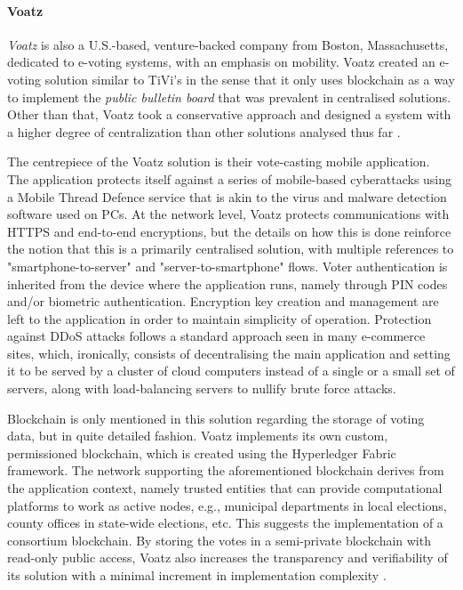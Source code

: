 \documentclass[../access.tex]{subfiles}
\begin{document}
\paragraph{Voatz \cite{Voatz2021}}
\textit{Voatz} is also a U.S.-based, venture-backed company from Boston, Massachusetts, dedicated to e-voting systems, with an emphasis on mobility. Voatz created an e-voting solution similar to TiVi's in the sense that it only uses blockchain as a way to implement the \textit{public bulletin board} that was prevalent in centralised solutions. Other than that, Voatz took a conservative approach and designed a system with a higher degree of centralization than other solutions analysed thus far \cite{Voatz2021}.
\par
The centrepiece of the Voatz solution is their vote-casting mobile application. The application protects itself against a series of mobile-based cyberattacks using a Mobile Thread Defence service that is akin to the virus and malware detection software used on PCs. At the network level, Voatz protects communications with HTTPS and end-to-end encryptions, but the details on how this is done reinforce the notion that this is a primarily centralised solution, with multiple references to "smartphone-to-server" and "server-to-smartphone" flows. Voter authentication is inherited from the device where the application runs, namely through PIN codes and/or biometric authentication. Encryption key creation and management are left to the application in order to maintain simplicity of operation. Protection against DDoS attacks follows a standard approach seen in many e-commerce sites, which, ironically, consists of decentralising the main application and setting it to be served by a cluster of cloud computers instead of a single or a small set of servers, along with load-balancing servers to nullify brute force attacks.
\par
Blockchain is only mentioned in this solution regarding the storage of voting data, but in quite detailed fashion. Voatz implements its own custom, permissioned blockchain, which is created using the Hyperledger Fabric framework. The network supporting the aforementioned blockchain derives from the application context, namely trusted entities that can provide computational platforms to work as active nodes, e.g., municipal departments in local elections, county offices in state-wide elections, etc. This suggests the implementation of a consortium blockchain. By storing the votes in a semi-private blockchain with read-only public access, Voatz also increases the transparency and verifiability of its solution with a minimal increment in implementation complexity \cite{Moore2019}.
\end{document}
